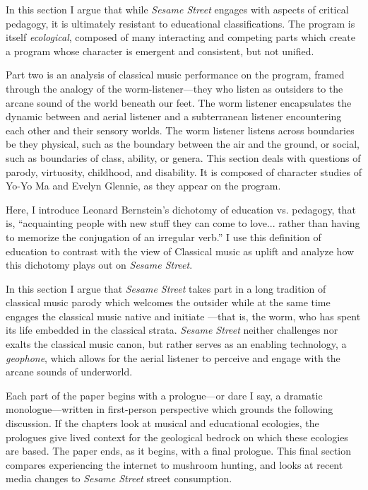 \documentclass[12pt,letterpaper]{article}
\newcommand{\ses}{\textit{Sesame Street }}
\begin{document}
	In this section I argue that while 
	\textit{Sesame
	Street} engages with aspects of critical pedagogy, it is ultimately 
	resistant to educational classifications. The program is itself
	\textit{ecological}, composed of many interacting and competing parts
	which create a program whose character is emergent and consistent, but
	not unified.   

	Part two is an analysis of classical music performance on the program, 
	framed through the analogy of the worm-listener---they who listen as 
	outsiders to 
	the arcane sound of the world beneath our feet. The worm listener
	encapsulates the dynamic between and aerial listener and a subterranean
	listener encountering each other and their sensory worlds. The worm 
	listener listens across boundaries be they physical, such as the
	boundary between the air and the ground, or social, such as boundaries
	of class, ability, or genera.
	This section deals with
	questions of parody, virtuosity, childhood, and disability. It 
	is composed of character studies of Yo-Yo Ma and Evelyn Glennie, 
	as they appear on the program.   

	Here, I introduce Leonard Bernstein's dichotomy of education vs.
	pedagogy, that is, ``acquainting people with 
	new stuff they can come to love... rather than having to memorize the 
	conjugation of an irregular verb.''\autocite[71]{Kopfstein} I use this
	definition of education to contrast with the view of Classical music as 
	uplift and analyze how this dichotomy plays out on \textit{Sesame
	Street}.  

	In this section I argue that \textit{Sesame Street} takes part in a
	long tradition of classical music parody which welcomes the outsider
	while at the same time engages the classical music native and initiate
	---that is, the worm, who has spent its life embedded in the classical
	strata.
	\textit{Sesame Street} neither challenges nor exalts the classical 
	music canon, but rather serves as an enabling technology, a 
	\textit{geophone}, which allows for the aerial listener to perceive and
	engage with the arcane sounds of underworld.  
	
	Each part of the paper begins with a prologue---or dare I say, a 
	dramatic monologue---written in first-person perspective
	which grounds the following discussion. If the chapters look at
	musical and educational ecologies, the prologues give lived context for
	the geological bedrock on which these ecologies are based. The paper 
	ends, as it begins, with a final prologue. This final section compares
	experiencing the internet to mushroom hunting, and looks at recent media	changes to \ses street consumption.  
\end{document}
